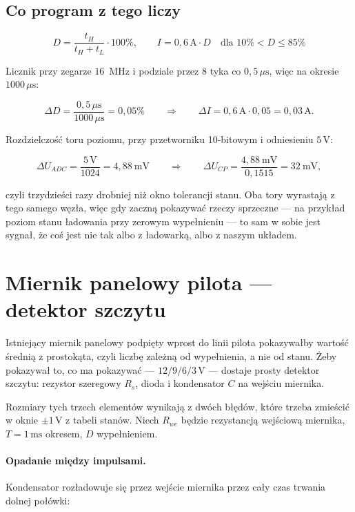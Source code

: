 \documentclass[a4paper,11pt]{article}
\newcommand{\volt}{\,\mathrm{V}}
\newcommand{\amp}{\,\mathrm{A}}
\newcommand{\us}{\,\mu\mathrm{s}}
\newcommand{\ms}{\,\mathrm{ms}}
\begin{document}
\subsection{Co program z tego liczy}

\begin{equation}
D=\frac{t_H}{t_H+t_L}\cdot100\%,
\qquad
I = 0{,}6\amp\cdot D \quad\text{dla } 10\% < D \le 85\%
\end{equation}

Licznik przy zegarze $16$~MHz i podziale przez $8$ tyka co $0{,}5\us$, więc na
okresie $1000\us$:

\[
\Delta D=\frac{0{,}5\us}{1000\us}=0{,}05\%
\qquad\Longrightarrow\qquad
\Delta I = 0{,}6\amp\cdot0{,}05=0{,}03\amp .
\]

Rozdzielczość toru poziomu, przy przetworniku 10-bitowym i odniesieniu $5\volt$:

\[
\Delta U_{ADC}=\frac{5\volt}{1024}=4{,}88\ \mathrm{mV}
\qquad\Longrightarrow\qquad
\Delta U_{CP}=\frac{4{,}88\ \mathrm{mV}}{0{,}1515}=32\ \mathrm{mV},
\]

czyli trzydzieści razy drobniej niż okno tolerancji stanu. Oba tory wyrastają
z tego samego węzła, więc gdy zaczną pokazywać rzeczy sprzeczne --- na przykład
poziom stanu ładowania przy zerowym wypełnieniu --- to sam w sobie jest sygnał,
że coś jest nie tak albo z ładowarką, albo z naszym układem.

\section{Miernik panelowy pilota --- detektor szczytu}
\label{sec:szczyt}

Istniejący miernik panelowy podpięty wprost do linii pilota pokazywałby wartość
średnią z prostokąta, czyli liczbę zależną od wypełnienia, a nie od stanu. Żeby
pokazywał to, co ma pokazywać --- $12/9/6/3\volt$ --- dostaje prosty detektor
szczytu: rezystor szeregowy $R_s$, dioda i kondensator $C$ na wejściu miernika.

Rozmiary tych trzech elementów wynikają z dwóch błędów, które trzeba zmieścić
w oknie $\pm1\volt$ z tabeli stanów. Niech $R_{we}$ będzie rezystancją wejściową
miernika, $T=1\ms$ okresem, $D$ wypełnieniem.

\paragraph{Opadanie między impulsami.} Kondensator rozładowuje się przez wejście
miernika przez cały czas trwania dolnej połówki:
\end{document}
